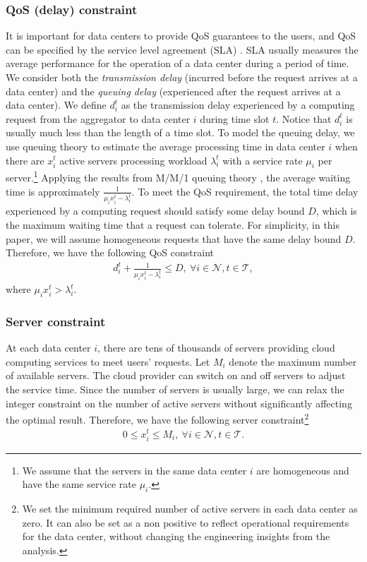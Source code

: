 \documentclass[journal]{IEEEtran}
\begin{document}
	\subsubsection{QoS (delay) constraint}
	It is important for data centers to provide QoS guarantees to the users, and QoS can be specified by the service level agreement (SLA) \cite{sla}. SLA usually measures the average performance for the operation of a data center during a period of time. We consider both the \emph{transmission delay} (incurred before the request arrives at a data center) and the \emph{queuing delay} (experienced after the request arrives at a data center). We define $d_{i}^{t}$ as the transmission delay experienced by a computing request from the aggregator to data center $i$ during time slot $t$. Notice that $d_i^t$ is usually much less than the length of a time slot. To model the queuing delay, we use queuing theory to estimate the average processing time in data center $i$ when there are $x_{i}^{t}$ active servers processing workload $\lambda_{i}^{t}$ with a service rate $\mu_{i}$ per server.\footnote{We assume that the servers in the same data center $i$ are homogeneous and have the same service rate $\mu_i$.} Applying the results from M/M/1 queuing theory \cite{sigmetrics}, the average waiting time is approximately $\frac{1}{\mu_i x_{i}^{t}- \lambda_{i}^{t}}$. To meet the QoS requirement, the total time delay experienced by a computing request should satisfy some delay bound $D$, which is the maximum waiting time that a request can tolerate. For simplicity, in this paper, we will assume homogeneous requests that have the same delay bound $D$. Therefore, we have the following QoS constraint
	\begin{align}\label{qos}
		d_{i}^{t} + \frac{1}{\mu_i x_i^t- \lambda_i^t} \leq D,~\forall i \in \mathcal{N}, t \in \mathcal{T},
	\end{align}
	where $\mu_i x_{i}^{t} > \lambda_i^t$.
	
	\subsubsection{Server constraint}
	At each data center $i$, there are tens of thousands of servers providing cloud computing services to meet users' requests. Let $M_{i}$ denote the maximum number of available servers. The cloud provider can switch on and off servers to adjust the service time. Since the number of servers is usually large, we can relax the integer constraint on the number of active servers without significantly affecting the optimal result. Therefore, we have the following server constraint\footnote{We set the minimum required number of active servers in each data center as zero. It can also be set as a non positive to reflect operational requirements for the data center, without changing the engineering insights from the analysis.}
	\begin{align}\label{server}
		0 \leq x_{i}^{t} \leq M_{i},~\forall i \in \mathcal{N}, t \in \mathcal{T}.
	\end{align}
	
\end{document}
